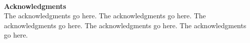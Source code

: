 ~\\[1in] %
\textbf{\Huge Acknowledgments}\\

\noindent 
The acknowledgments go here.
The acknowledgments go here.
The acknowledgments go here.
The acknowledgments go here.
The acknowledgments go here.
